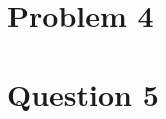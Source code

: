 \documentclass[12pt]{article}
\begin{document}
\section{Problem 4}

\section{Question 5}

% 
% 
\end{document}
